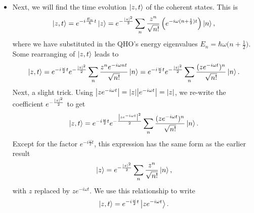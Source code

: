 \documentclass[11pt, a4paper]{article}
\begin{document}
\begin{itemize}
	\item Next, we will find the time evolution $ \ket{z, t} $ of the coherent states. This is
	\begin{equation*}
		\ket{z, t} = e^{-i\frac{E_{n}}{\hbar}t} \ket{z} = e^{-\frac{\abs{z}^{2}}{2}} \sum_{n}\frac{z^{n}}{\sqrt{n!}} \left(e^{-i\omega (n + \frac{1}{2})t}\right) \ket{n},
	\end{equation*}
	where we have substituted in the QHO's energy eigenvalues $ E_{n} = \hbar\omega \big(n + \frac{1}{2}\big) $. Some rearranging of $ \ket{z, t} $ leads to
	\begin{equation*}
		\ket{z, t} = e^{-i\frac{\omega}{2}t}e^{-\frac{\abs{z}^{2}}{2}}\sum_{n}\frac{z^{n}e^{-i\omega n t}}{\sqrt{n!}}\ket{n} = e^{-i\frac{\omega}{2}t}e^{-\frac{\abs{z}^{2}}{2}} \sum_{n} \frac{(ze^{-i\omega t})^{n}}{\sqrt{n!}} \ket{n}.
	\end{equation*}
	Next, a slight trick. Using $ \abs{ze^{-i\omega t}} = \abs{z}\abs{e^{-i\omega t}} = \abs{z}$, we re-write the coefficient $ e^{-\frac{\abs{z}^{2}}{2}} $ to get
	\begin{equation*}
		\ket{z, t} =  e^{-i\frac{\omega}{2}t}e^{-\frac{\abs{ze^{-i\omega t}}^{2}}{2}} \sum_{n} \frac{(ze^{-i\omega t})^{n}}{\sqrt{n!}} \ket{n}.
	\end{equation*}
	Except for the factor $ e^{-i\frac{\omega}{2}t} $, this expression has the same form as the earlier result
	\begin{equation*}
		\ket{z} = e^{-\frac{\abs{z}^{2}}{2}} \sum_{n}\frac{z^{n}}{\sqrt{n!}} \ket{n},
	\end{equation*}
	with $ z $ replaced by $ z e^{-i\omega t} $. We use this relationship to write
	\begin{equation*}
		\ket{z, t} = e^{-i \frac{\omega}{2}t} \ket{z e^{-i\omega t}}.
	\end{equation*}
	

\end{itemize}
\end{document}
